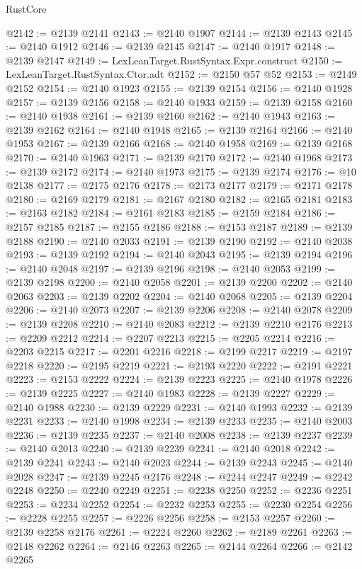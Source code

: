 \begin{lexlean}{RustCore}
\begin{coremodule}
@2142 := @2139 @2141
@2143 := @2140 @1907
@2144 := @2139 @2143
@2145 := @2140 @1912
@2146 := @2139 @2145
@2147 := @2140 @1917
@2148 := @2139 @2147
@2149 := LexLeanTarget.RustSyntax.Expr.construct
@2150 := LexLeanTarget.RustSyntax.Ctor.adt
@2152 := @2150 @57 @52
@2153 := @2149 @2152
@2154 := @2140 @1923
@2155 := @2139 @2154
@2156 := @2140 @1928
@2157 := @2139 @2156
@2158 := @2140 @1933
@2159 := @2139 @2158
@2160 := @2140 @1938
@2161 := @2139 @2160
@2162 := @2140 @1943
@2163 := @2139 @2162
@2164 := @2140 @1948
@2165 := @2139 @2164
@2166 := @2140 @1953
@2167 := @2139 @2166
@2168 := @2140 @1958
@2169 := @2139 @2168
@2170 := @2140 @1963
@2171 := @2139 @2170
@2172 := @2140 @1968
@2173 := @2139 @2172
@2174 := @2140 @1973
@2175 := @2139 @2174
@2176 := @10 @2138
@2177 := @2175 @2176
@2178 := @2173 @2177
@2179 := @2171 @2178
@2180 := @2169 @2179
@2181 := @2167 @2180
@2182 := @2165 @2181
@2183 := @2163 @2182
@2184 := @2161 @2183
@2185 := @2159 @2184
@2186 := @2157 @2185
@2187 := @2155 @2186
@2188 := @2153 @2187
@2189 := @2139 @2188
@2190 := @2140 @2033
@2191 := @2139 @2190
@2192 := @2140 @2038
@2193 := @2139 @2192
@2194 := @2140 @2043
@2195 := @2139 @2194
@2196 := @2140 @2048
@2197 := @2139 @2196
@2198 := @2140 @2053
@2199 := @2139 @2198
@2200 := @2140 @2058
@2201 := @2139 @2200
@2202 := @2140 @2063
@2203 := @2139 @2202
@2204 := @2140 @2068
@2205 := @2139 @2204
@2206 := @2140 @2073
@2207 := @2139 @2206
@2208 := @2140 @2078
@2209 := @2139 @2208
@2210 := @2140 @2083
@2212 := @2139 @2210 @2176
@2213 := @2209 @2212
@2214 := @2207 @2213
@2215 := @2205 @2214
@2216 := @2203 @2215
@2217 := @2201 @2216
@2218 := @2199 @2217
@2219 := @2197 @2218
@2220 := @2195 @2219
@2221 := @2193 @2220
@2222 := @2191 @2221
@2223 := @2153 @2222
@2224 := @2139 @2223
@2225 := @2140 @1978
@2226 := @2139 @2225
@2227 := @2140 @1983
@2228 := @2139 @2227
@2229 := @2140 @1988
@2230 := @2139 @2229
@2231 := @2140 @1993
@2232 := @2139 @2231
@2233 := @2140 @1998
@2234 := @2139 @2233
@2235 := @2140 @2003
@2236 := @2139 @2235
@2237 := @2140 @2008
@2238 := @2139 @2237
@2239 := @2140 @2013
@2240 := @2139 @2239
@2241 := @2140 @2018
@2242 := @2139 @2241
@2243 := @2140 @2023
@2244 := @2139 @2243
@2245 := @2140 @2028
@2247 := @2139 @2245 @2176
@2248 := @2244 @2247
@2249 := @2242 @2248
@2250 := @2240 @2249
@2251 := @2238 @2250
@2252 := @2236 @2251
@2253 := @2234 @2252
@2254 := @2232 @2253
@2255 := @2230 @2254
@2256 := @2228 @2255
@2257 := @2226 @2256
@2258 := @2153 @2257
@2260 := @2139 @2258 @2176
@2261 := @2224 @2260
@2262 := @2189 @2261
@2263 := @2148 @2262
@2264 := @2146 @2263
@2265 := @2144 @2264
@2266 := @2142 @2265

\end{coremodule}
\end{lexlean}
